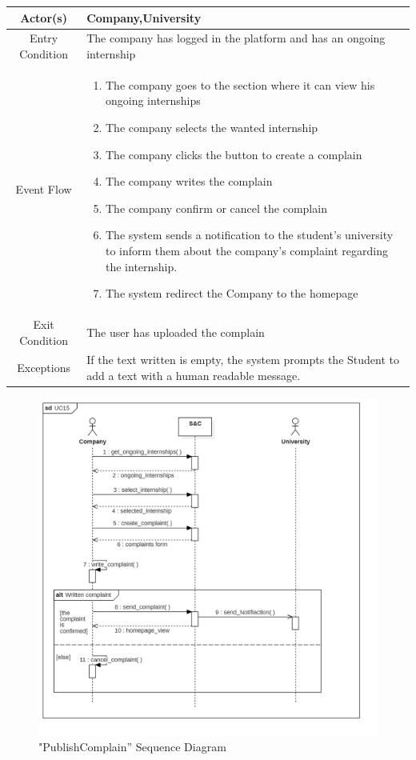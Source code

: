 \documentclass{article}
\begin{document}
\begin{table}[H]
    \centering
    \begin{tabular}{|c|p{10cm}|}
    \hline
        Actor(s)  & Company,University\\ 
    \hline
        Entry Condition &  
        The company has logged in the platform and has an ongoing internship\\
    \hline
        Event Flow &
        \begin{enumerate}
            \item The company goes to the section where it can view his ongoing internships
            \item The company selects the wanted internship
            \item The company clicks the button to create a complain
            \item The company writes the complain
            \item The company confirm or cancel the complain
            \item The system sends a notification to the student's university to inform them about the company's complaint regarding the internship.
            \item The system redirect the Company to the homepage
        \end{enumerate}
        \\
    \hline
        Exit Condition & The user has uploaded the complain\\
    \hline
        Exceptions &  If the text written is empty, the system prompts the Student to add a text with a human readable message.\\
    \hline
    \end{tabular}
    \label{tab:my_label}
\end{table}
\begin{figure}[H]
    \centering
    \includegraphics[width=1\linewidth]{sequenceDiagrams/UC15.jpg}
    \caption{"PublishComplain” Sequence Diagram}
    \label{fig:enter-label}
\end{figure}
\end{document}
